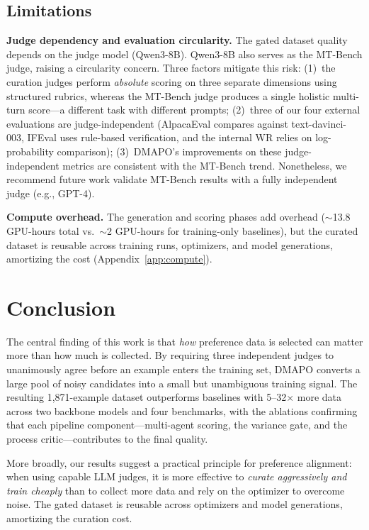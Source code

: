 \documentclass{article}
\newcommand{\method}{DMAPO}
\begin{document}
\subsection{Limitations}

\textbf{Judge dependency and evaluation circularity.} The gated dataset quality depends on the judge model (Qwen3-8B). Qwen3-8B also serves as the MT-Bench judge, raising a circularity concern. Three factors mitigate this risk: (1)~the curation judges perform \emph{absolute} scoring on three separate dimensions using structured rubrics, whereas the MT-Bench judge produces a single holistic multi-turn score---a different task with different prompts; (2)~three of our four external evaluations are judge-independent (AlpacaEval compares against text-davinci-003, IFEval uses rule-based verification, and the internal WR relies on log-probability comparison); (3)~\method{}'s improvements on these judge-independent metrics are consistent with the MT-Bench trend. Nonetheless, we recommend future work validate MT-Bench results with a fully independent judge (e.g., GPT-4).

\textbf{Compute overhead.} The generation and scoring phases add overhead ($\sim$13.8 GPU-hours total vs.\ $\sim$2 GPU-hours for training-only baselines), but the curated dataset is reusable across training runs, optimizers, and model generations, amortizing the cost (Appendix~\ref{app:compute}).

\section{Conclusion}
\label{sec:conclusion}

The central finding of this work is that \emph{how} preference data is selected can matter more than how much is collected. By requiring three independent judges to unanimously agree before an example enters the training set, \method{} converts a large pool of noisy candidates into a small but unambiguous training signal. The resulting 1,871-example dataset outperforms baselines with 5--32$\times$ more data across two backbone models and four benchmarks, with the ablations confirming that each pipeline component---multi-agent scoring, the variance gate, and the process critic---contributes to the final quality.

More broadly, our results suggest a practical principle for preference alignment: when using capable LLM judges, it is more effective to \emph{curate aggressively and train cheaply} than to collect more data and rely on the optimizer to overcome noise. The gated dataset is reusable across optimizers and model generations, amortizing the curation cost.
\end{document}
